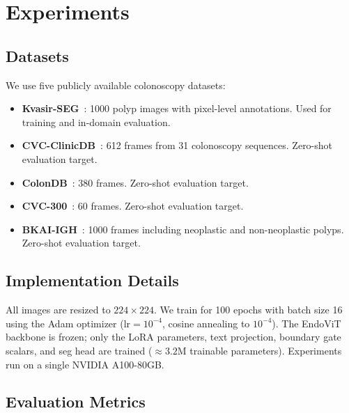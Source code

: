 
\section{Experiments}
\label{sec:experiments}

\subsection{Datasets}
\label{subsec:datasets}

We use five publicly available colonoscopy datasets:
\begin{itemize}
    \item \textbf{Kvasir-SEG}~\cite{jha2020kvasir}: 1000 polyp images with
          pixel-level annotations. Used for training and in-domain evaluation.
    \item \textbf{CVC-ClinicDB}~\cite{bernal2015clinicdb}: 612 frames from
          31 colonoscopy sequences. Zero-shot evaluation target.
    \item \textbf{ColonDB}~\cite{tajbakhsh2015colondb}: 380 frames.
          Zero-shot evaluation target.
    \item \textbf{CVC-300}~\cite{vazquez2017cvc300}: 60 frames.
          Zero-shot evaluation target.
    \item \textbf{BKAI-IGH}~\cite{ngoc2021bkai}: 1000 frames including
          neoplastic and non-neoplastic polyps. Zero-shot evaluation target.
\end{itemize}

\subsection{Implementation Details}
\label{subsec:impl}

All images are resized to $224{\times}224$. We train for 100 epochs with batch
size 16 using the Adam optimizer ($\text{lr}{=}10^{-4}$, cosine annealing to
$10^{-4}$). The EndoViT backbone is frozen; only the LoRA parameters, text
projection, boundary gate scalars, and seg head are trained
($\approx 3.2$M trainable parameters). Experiments run on a single NVIDIA A100-80GB.

\subsection{Evaluation Metrics}
\label{subsec:metrics}

